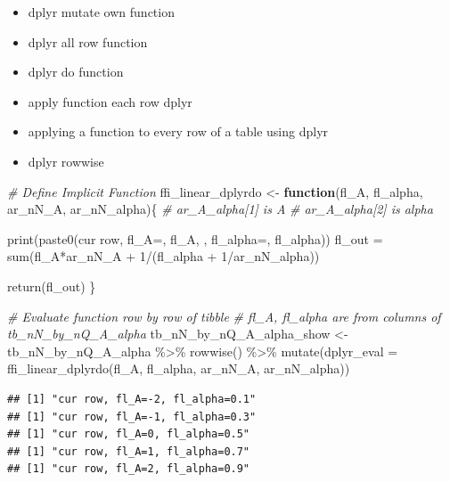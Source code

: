 \documentclass[
]{book}
\newenvironment{Shaded}{\begin{snugshade}}{\end{snugshade}}
\newcommand{\AttributeTok}[1]{\textcolor[rgb]{0.77,0.63,0.00}{#1}}
\newcommand{\CommentTok}[1]{\textcolor[rgb]{0.56,0.35,0.01}{\textit{#1}}}
\newcommand{\ControlFlowTok}[1]{\textcolor[rgb]{0.13,0.29,0.53}{\textbf{#1}}}
\newcommand{\DecValTok}[1]{\textcolor[rgb]{0.00,0.00,0.81}{#1}}
\newcommand{\FunctionTok}[1]{\textcolor[rgb]{0.00,0.00,0.00}{#1}}
\newcommand{\NormalTok}[1]{#1}
\newcommand{\OtherTok}[1]{\textcolor[rgb]{0.56,0.35,0.01}{#1}}
\newcommand{\SpecialCharTok}[1]{\textcolor[rgb]{0.00,0.00,0.00}{#1}}
\newcommand{\StringTok}[1]{\textcolor[rgb]{0.31,0.60,0.02}{#1}}
\providecommand{\tightlist}{%
  \setlength{\itemsep}{0pt}\setlength{\parskip}{0pt}}
\begin{document}
\begin{itemize}
\tightlist
\item
  dplyr mutate own function
\item
  dplyr all row function
\item
  dplyr do function
\item
  apply function each row dplyr
\item
  applying a function to every row of a table using dplyr
\item
  dplyr rowwise
\end{itemize}

\begin{Shaded}
\begin{Highlighting}[]
\CommentTok{\# Define Implicit Function}
\NormalTok{ffi\_linear\_dplyrdo }\OtherTok{\textless{}{-}} \ControlFlowTok{function}\NormalTok{(fl\_A, fl\_alpha, ar\_nN\_A, ar\_nN\_alpha)\{}
  \CommentTok{\# ar\_A\_alpha[1] is A}
  \CommentTok{\# ar\_A\_alpha[2] is alpha}

  \FunctionTok{print}\NormalTok{(}\FunctionTok{paste0}\NormalTok{(}\StringTok{\textquotesingle{}cur row, fl\_A=\textquotesingle{}}\NormalTok{, fl\_A, }\StringTok{\textquotesingle{}, fl\_alpha=\textquotesingle{}}\NormalTok{, fl\_alpha))}
\NormalTok{  fl\_out }\OtherTok{=} \FunctionTok{sum}\NormalTok{(fl\_A}\SpecialCharTok{*}\NormalTok{ar\_nN\_A }\SpecialCharTok{+} \DecValTok{1}\SpecialCharTok{/}\NormalTok{(fl\_alpha }\SpecialCharTok{+} \DecValTok{1}\SpecialCharTok{/}\NormalTok{ar\_nN\_alpha))}

  \FunctionTok{return}\NormalTok{(fl\_out)}
\NormalTok{\}}

\CommentTok{\# Evaluate function row by row of tibble}
\CommentTok{\# fl\_A, fl\_alpha are from columns of tb\_nN\_by\_nQ\_A\_alpha}
\NormalTok{tb\_nN\_by\_nQ\_A\_alpha\_show }\OtherTok{\textless{}{-}}\NormalTok{ tb\_nN\_by\_nQ\_A\_alpha }\SpecialCharTok{\%\textgreater{}\%}
  \FunctionTok{rowwise}\NormalTok{() }\SpecialCharTok{\%\textgreater{}\%}
  \FunctionTok{mutate}\NormalTok{(}\AttributeTok{dplyr\_eval =}
           \FunctionTok{ffi\_linear\_dplyrdo}\NormalTok{(fl\_A, fl\_alpha, ar\_nN\_A, ar\_nN\_alpha))}
\end{Highlighting}
\end{Shaded}

\begin{verbatim}
## [1] "cur row, fl_A=-2, fl_alpha=0.1"
## [1] "cur row, fl_A=-1, fl_alpha=0.3"
## [1] "cur row, fl_A=0, fl_alpha=0.5"
## [1] "cur row, fl_A=1, fl_alpha=0.7"
## [1] "cur row, fl_A=2, fl_alpha=0.9"
\end{verbatim}
\end{document}
